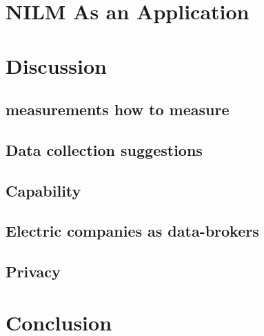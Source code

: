 \glsresetall 


\glsresetall
 

\glsresetall
 

\glsresetall


\glsresetall
\chapter{NILM As an Application} 

\glsresetall
\chapter{Discussion}

\section{measurements how to measure}
\section{Data collection suggestions}
\section{Capability}
\section{Electric companies as data-brokers }
\section{Privacy}

\glsresetall
\chapter{Conclusion}
\begingroup
	\raggedright
	
\endgroup

